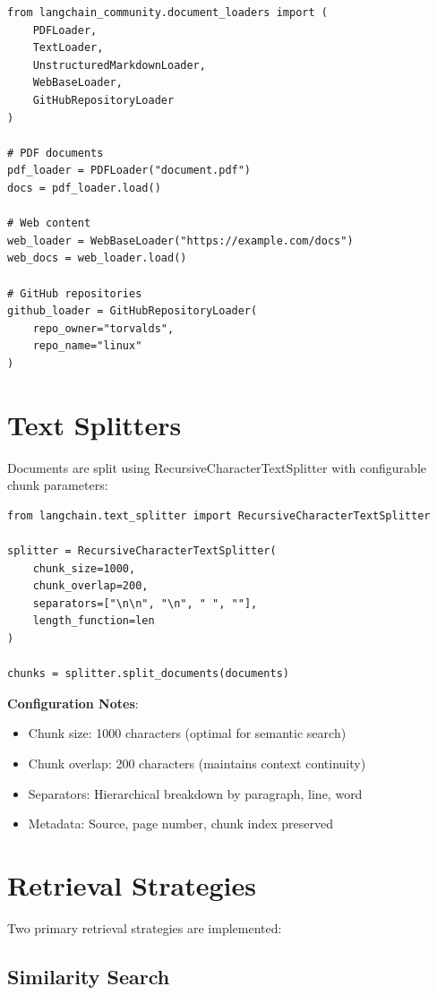 \documentclass{report}
\begin{document}
\begin{lstlisting}
from langchain_community.document_loaders import (
    PDFLoader,
    TextLoader,
    UnstructuredMarkdownLoader,
    WebBaseLoader,
    GitHubRepositoryLoader
)

# PDF documents
pdf_loader = PDFLoader("document.pdf")
docs = pdf_loader.load()

# Web content
web_loader = WebBaseLoader("https://example.com/docs")
web_docs = web_loader.load()

# GitHub repositories
github_loader = GitHubRepositoryLoader(
    repo_owner="torvalds",
    repo_name="linux"
)
\end{lstlisting}

\section{Text Splitters}

Documents are split using RecursiveCharacterTextSplitter with configurable chunk parameters:

\begin{lstlisting}
from langchain.text_splitter import RecursiveCharacterTextSplitter

splitter = RecursiveCharacterTextSplitter(
    chunk_size=1000,
    chunk_overlap=200,
    separators=["\n\n", "\n", " ", ""],
    length_function=len
)

chunks = splitter.split_documents(documents)
\end{lstlisting}

\textbf{Configuration Notes}:
\begin{itemize}
    \item Chunk size: 1000 characters (optimal for semantic search)
    \item Chunk overlap: 200 characters (maintains context continuity)
    \item Separators: Hierarchical breakdown by paragraph, line, word
    \item Metadata: Source, page number, chunk index preserved
\end{itemize}

\section{Retrieval Strategies}

Two primary retrieval strategies are implemented:

\subsection{Similarity Search}
\end{document}
